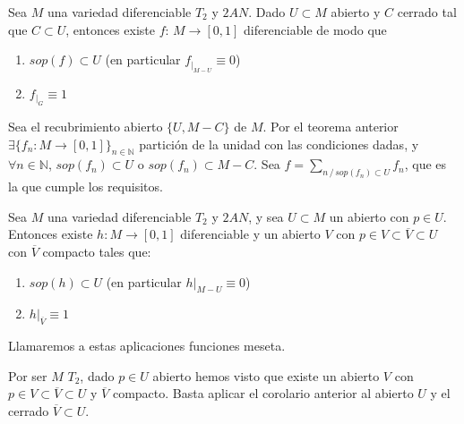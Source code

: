 \begin{cor}
Sea $M$ una variedad diferenciable $T_2$ y $2AN$. Dado $U \subset M$ abierto y $C$ cerrado tal que $C \subset U$, entonces existe $f:\,M\longrightarrow[0,1]$ diferenciable de modo que\begin{enumerate}
    \item $sop(f) \subset U$ (en particular $f_{|_{M-U}}\equiv 0$)
    \item $f_{|_{G}} \equiv 1$
\end{enumerate}
\end{cor}
\begin{dem}
Sea el recubrimiento abierto $\{U,M-C\}$ de $M$. Por el teorema anterior $\exists \{f_n: M \to [0,1]\}_{n\in\mathbb{N}}$ partición de la unidad con las condiciones dadas, y $\forall n\in \mathbb{N}$, $sop(f_n) \subset U$ o $sop(f_n) \subset M-C$. Sea $\displaystyle f = \underset{n \,/\, sop(f_n) \subset U}{\sum} f_n$, que es la que cumple los requisitos. 
\end{dem}

\begin{cor}
Sea $M$ una variedad diferenciable $T_2$ y $2AN$, y sea $U \subset M$ un abierto con $p \in U$. Entonces existe $h:M\to [0,1]$ diferenciable y un abierto $V$ con $p \in V \subset \overline{V} \subset U$ con $\overline{V}$ compacto tales que:
\begin{enumerate}
    \item $sop(h) \subset U$ (en particular $h|_{M-U}\equiv 0$)
    \item $h|_{\overline{V}}\equiv 1$
\end{enumerate}
Llamaremos a estas aplicaciones funciones meseta.
\end{cor} 
\begin{dem}
Por ser $M$ $T_2$, dado $p \in U$ abierto hemos visto que existe un abierto $V$ con $p \in V \subset \overline{V} \subset U$ y $\overline{V}$ compacto. Basta aplicar el corolario anterior al abierto $U$ y el cerrado $\overline{V} \subset U$.
\end{dem}




